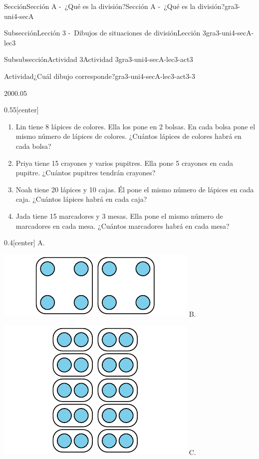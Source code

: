 \documentclass[twoside,10pt,]{article}
\begin{document}
\begin{sectionptx}{Sección}{Sección A -~¿Qué es la división?}{}{Sección A -~¿Qué es la división?}{}{}{gra3-uni4-secA}
\begin{subsectionptx}{Subsección}{Lección 3 -~Dibujos de situaciones de división}{}{Lección 3}{}{}{gra3-uni4-secA-lec3}
\begin{subsubsectionptx}{Subsubsección}{Actividad 3}{}{Actividad 3}{}{}{gra3-uni4-secA-lec3-act3}
\begin{activity}{Actividad}{¿Cuál dibujo corresponde?}{gra3-uni4-secA-lec3-act3-3}
\begin{sidebyside}{2}{0}{0}{0.05}
\begin{sbspanel}{0.55}[center]
\begin{enumerate}
\item{}Lin tiene 8 lápices de colores. Ella los pone en 2 bolsas. En cada bolsa pone el mismo número de lápices de colores. ¿Cuántos lápices de colores habrá en cada bolsa?%
\item{}Priya tiene 15 crayones y varios pupitres. Ella pone 5 crayones en cada pupitre. ¿Cuántos pupitres tendrán crayones?%
\item{}Noah tiene 20 lápices y 10 cajas. Él pone el mismo número de lápices en cada caja. ¿Cuántos lápices habrá en cada caja?%
\item{}Jada tiene 15 marcadores y 3 mesas. Ella pone el mismo número de marcadores en cada mesa. ¿Cuántos marcadores habrá en cada mesa?%
\end{enumerate}
\end{sbspanel}%
\begin{sbspanel}{0.4}[center]%
A.%
\par
\includegraphics[width=\linewidth]{external/svg-source/tikz-file-149313.pdf}
B.%
\par
\includegraphics[width=\linewidth]{external/svg-source/tikz-file-149314.pdf}
C.%
\par

\end{sbspanel}
\end{sidebyside}
\end{activity}
\end{subsubsectionptx}
\end{subsectionptx}
\end{sectionptx}
\end{document}
